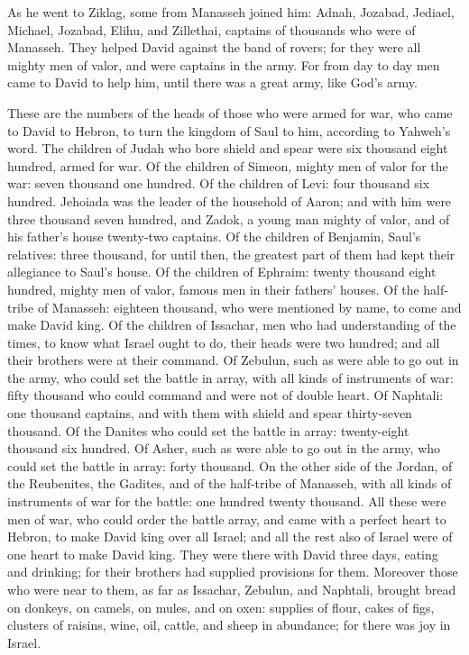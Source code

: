 {\par }{\PP {}As he went to Ziklag, some from Manasseh joined him: Adnah, Jozabad, Jediael, Michael, Jozabad, Elihu, and Zillethai, captains of thousands who were of Manasseh.
They helped David against the band of rovers; for they were all mighty men of valor, and were captains in the army.
For from day to day men came to David to help him, until there was a great army, like God’s army.
\par }{\PP {}These are the numbers of the heads of those who were armed for war, who came to David to Hebron, to turn the kingdom of Saul to him, according to Yahweh’s word.
The children of Judah who bore shield and spear were six thousand eight hundred, armed for war.
Of the children of Simeon, mighty men of valor for the war: seven thousand one hundred.
Of the children of Levi: four thousand six hundred.
Jehoiada was the leader of the household of Aaron; and with him were three thousand seven hundred,
and Zadok, a young man mighty of valor, and of his father’s house twenty-two captains.
Of the children of Benjamin, Saul’s relatives: three thousand, for until then, the greatest part of them had kept their allegiance to Saul’s house.
Of the children of Ephraim: twenty thousand eight hundred, mighty men of valor, famous men in their fathers’ houses.
Of the half-tribe of Manasseh: eighteen thousand, who were mentioned by name, to come and make David king.
Of the children of Issachar, men who had understanding of the times, to know what Israel ought to do, their heads were two hundred; and all their brothers were at their command.
Of Zebulun, such as were able to go out in the army, who could set the battle in array, with all kinds of instruments of war: fifty thousand who could command and were not of double heart.
Of Naphtali: one thousand captains, and with them with shield and spear thirty-seven thousand.
Of the Danites who could set the battle in array: twenty-eight thousand six hundred.
Of Asher, such as were able to go out in the army, who could set the battle in array: forty thousand.
On the other side of the Jordan, of the Reubenites, the Gadites, and of the half-tribe of Manasseh, with all kinds of instruments of war for the battle: one hundred twenty thousand.
All these were men of war, who could order the battle array, and came with a perfect heart to Hebron, to make David king over all Israel; and all the rest also of Israel were of one heart to make David king.
They were there with David three days, eating and drinking; for their brothers had supplied provisions for them.
Moreover those who were near to them, as far as Issachar, Zebulun, and Naphtali, brought bread on donkeys, on camels, on mules, and on oxen: supplies of flour, cakes of figs, clusters of raisins, wine, oil, cattle, and sheep in abundance; for there was joy in Israel.

}
